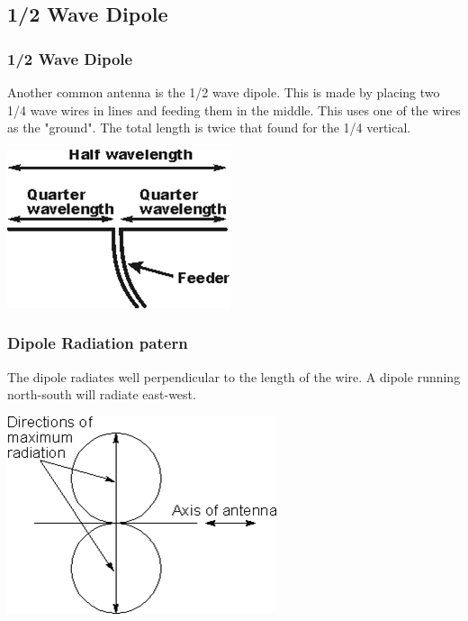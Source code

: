 \documentclass[10pt]{beamer}
\begin{document}
\subsection{1/2 Wave Dipole}

\begin{frame}
\frametitle{1/2 Wave Dipole}
Another common antenna is the 1/2 wave dipole. This is made by placing two 1/4 wave wires in lines and feeding them in the middle. This uses one of the wires as the "ground". The total length is twice that found for the 1/4 vertical.
\begin{center}
\includegraphics[height=.5\textheight]{hwavedipole.png}
\end{center}
\end{frame}

\begin{frame}
\frametitle{Dipole Radiation patern}
The dipole radiates well perpendicular to the length of the wire. A dipole running north-south will radiate east-west.
\begin{center}
\includegraphics[height=.5\textheight]{hwavedipolerad.png}
\end{center}
\end{frame}
\end{document}
